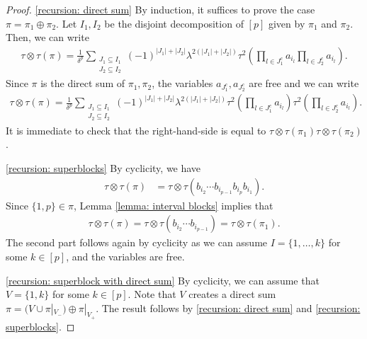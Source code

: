 \documentclass[12pt,reqno]{amsart}
\theoremstyle{plain}
\newcommand{\1}{\mathbf{1}}
\begin{document}
\begin{proof}
    \ref{recursion: direct sum} By induction, it suffices to prove the case $\pi=\pi_1\oplus \pi_2$. Let $I_1,I_2$ be the disjoint decomposition of $[p]$ given by $\pi_1$ and $\pi_2$. Then, we can write
    \begin{align*}
        \tau\otimes \tau(\pi)=\frac{1}{\delta^p}\sum_{\substack{J_1 \subseteq I_1\\ J_2 \subseteq I_2}}(-1)^{|J_1|+|J_2|}\lambda^{2(|J_1|+|J_2|)}\tau^2\left(\prod_{l \in J_1^c}a_{i_l}\prod_{l \in J_2^c}a_{i_l}\right).
    \end{align*}
    Since $\pi$ is the direct sum of $\pi_1,\pi_2$, the variables $a_{J_1^c}, a_{J_2^c}$ are free and we can write
    \begin{align*}
        \tau\otimes \tau(\pi)=\frac{1}{\delta^p}\sum_{\substack{J_1 \subseteq I_1\\ J_2 \subseteq I_2}}(-1)^{|J_1|+|J_2|}\lambda^{2(|J_1|+|J_2|)}\tau^2\left(\prod_{l \in J_1^c}a_{i_l}\right)\tau^2\left(\prod_{l \in J_2^c}a_{i_l}\right).
    \end{align*}
    It is immediate to check that the right-hand-side is equal to $\tau\otimes \tau(\pi_1)\tau\otimes \tau(\pi_2)$.

    \ref{recursion: superblocks} By cyclicity, we have
    \begin{align*}
        \tau\otimes \tau(\pi)&=\tau\otimes \tau(b_{i_2}\cdots b_{i_{p-1}}b_{i_{p}}b_{i_1}).
    \end{align*}
    Since $\{1,p\} \in \pi$, Lemma \ref{lemma: interval blocks} implies that
    \begin{align*}
        \tau\otimes \tau(\pi)=\tau\otimes \tau(b_{i_2}\cdots b_{i_{p-1}})=\tau\otimes \tau(\pi_1).
    \end{align*}
    The second part follows again by cyclicity as we can assume $I=\{1,\ldots,k\}$ for some $k \in [p]$, and the variables are free.

    \ref{recursion: superblock with direct sum} By cyclicity, we can assume that $V=\{1,k\}$ for some $k\in [p]$. Note that $V$ creates a direct sum $\pi=(V\cup \pi|_{V_-})\oplus \pi|_{V_+}$. The result follows by \ref{recursion: direct sum} and \ref{recursion: superblocks}.
\end{proof}
\end{document}
